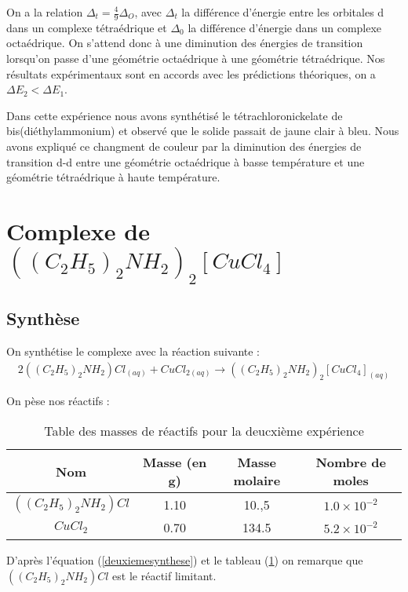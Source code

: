 \documentclass[12pt]{article}
\begin{document}
On a la relation $\Delta_t=\frac{4}{9}\Delta_O$, avec $\Delta_t$ la différence d'énergie entre les orbitales d dans un complexe tétraédrique et $\Delta_0$ la différence d'énergie dans un complexe octaédrique.
On s'attend donc à une diminution des énergies de transition lorsqu'on passe d'une géométrie octaédrique à une géométrie tétraédrique.
Nos résultats expérimentaux sont en accords avec les prédictions théoriques, on a $\Delta E_2 <  \Delta E_1$.

Dans cette expérience nous avons synthétisé le tétrachloronickelate de bis(diéthylammonium) et observé que le solide passait de jaune clair à bleu.
Nous avons expliqué ce changment de couleur par la diminution des énergies de transition d-d entre une géométrie octaédrique à basse température et une géométrie tétraédrique à haute température.

\section{Complexe  de $((C_2H_5)_2NH_2)_2[CuCl_4]$}
\subsection{Synthèse}
On synthétise le complexe avec la réaction suivante :
\begin{align}
    2((C_2H_5)_2NH_2)Cl_{(aq)} +  CuCl_{2(aq)} \longrightarrow ((C_2H_5)_2NH_2)_2[CuCl_4]_{(aq)}
\label{deuxiemesynthese}
\end{align}

On pèse nos réactifs :
\begin{table}[h!]
    \begin{center}
        \begin{tabular}{|c|c|c|c|}
            \hline
            Nom & Masse (en g) & Masse molaire & Nombre de moles \\
            \hline
            $((C_2H_5)_2NH_2)Cl$ & 1.10 & 10.,5 & $1.0\times 10^{-2}$ \\
            \hline
            $CuCl_2$ & 0.70 & 134.5 & $5.2 \times 10^{-2}$ \\
            \hline
        \end{tabular}
    \end{center}
    \caption{Table des masses de réactifs pour la deucxième expérience}
    \label{tab2:masse2}
\end{table}

D'après l'équation (\ref{deuxiemesynthese}) et le tableau (\ref{tab2:masse2}) on remarque que $((C_2H_5)_2NH_2)Cl$ est le réactif limitant.
\end{document}
